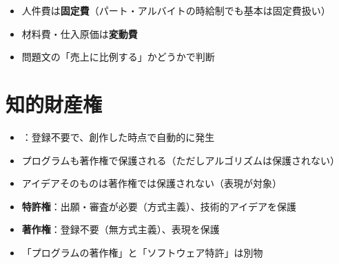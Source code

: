 \begin{pitfall}[固定費と変動費の分類ミス]
\begin{itemize}
  \item 人件費は\textbf{固定費}（パート・アルバイトの時給制でも基本は固定費扱い）
  \item 材料費・仕入原価は\textbf{変動費}
  \item 問題文の「売上に比例する」かどうかで判断
\end{itemize}
\end{pitfall}

\section{知的財産権}

\begin{hikaku}[知的財産権の比較]
\end{hikaku}

\begin{teigi}[著作権の特徴]
\begin{itemize}
  \item {}：登録不要で、創作した時点で自動的に発生
  \item プログラムも著作権で保護される（ただしアルゴリズムは保護されない）
  \item アイデアそのものは著作権では保護されない（表現が対象）
\end{itemize}
\end{teigi}

\begin{pitfall}[特許権と著作権の混同]
\begin{itemize}
  \item \textbf{特許権}：出願・審査が必要（方式主義）、技術的アイデアを保護
  \item \textbf{著作権}：登録不要（無方式主義）、表現を保護
  \item 「プログラムの著作権」と「ソフトウェア特許」は別物
\end{itemize}
\end{pitfall}

